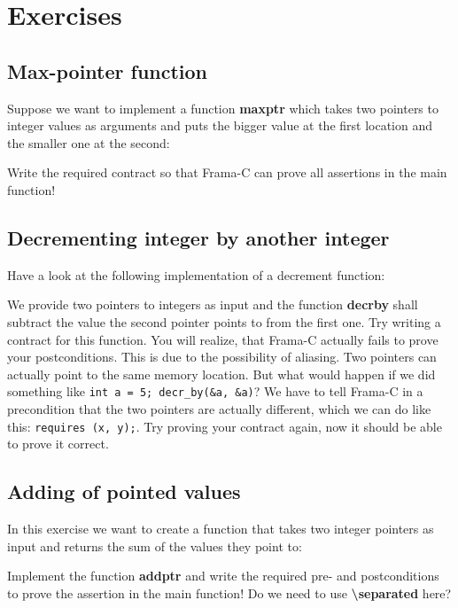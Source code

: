 \section{Exercises}

\subsection{Max-pointer function}

Suppose we want to implement a function \textbf{max\textunderscore ptr} which takes two pointers to integer values as arguments and puts the bigger value at the first location and the smaller one at the second: 


Write the required contract so that Frama-C can prove all assertions in the main function! 

\subsection{Decrementing integer by another integer}

Have a look at the following implementation of a decrement function:


We provide two pointers to integers as input and the function \textbf{decr\textunderscore by} shall subtract the value the second pointer points to from the first one. Try writing a contract for this function. You will realize, that Frama-C actually fails to prove your postconditions. This is due to the possibility of aliasing. Two pointers can actually point to the same memory location. But what would happen if we did something like \texttt{int a = 5; decr_by(&a, &a)}? We have to tell Frama-C in a precondition that the two pointers are actually different, which we can do like this: \texttt{requires \separated (x, y);}. Try proving your contract again, now it should be able to prove it correct. 

\subsection{Adding of pointed values}

In this exercise we want to create a function that takes two integer pointers as input and returns the sum of the values they point to:


Implement the function \textbf{add\textunderscore ptr} and write the required pre- and postconditions to prove the assertion in the main function! Do we need to use \textbf{\textbackslash separated} here? 
